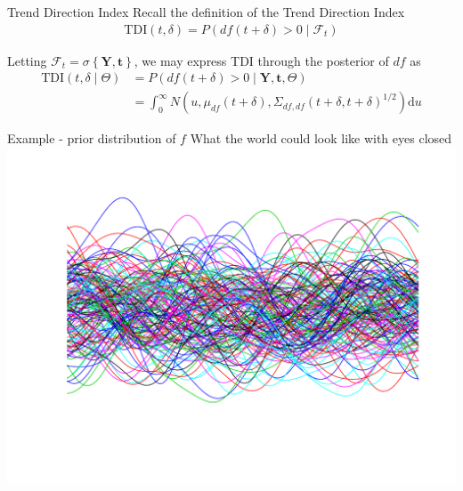 \documentclass[ignorenonframetext,xcolor=pdflatex,table,dvipsnames,serif]{beamer}
\begin{document}
\begin{frame}{Trend Direction Index}
Recall the definition of the \alert{Trend Direction Index}
\begin{align*}
  \mathrm{TDI}(t, \delta) = P(df(t + \delta) > 0 \mid \mathcal{F}_t)	
\end{align*}

\vspace{0.8cm}

Letting $\mathcal{F}_t = \sigma\left\{\mathbf{Y}, \mathbf{t}\right\}$, we may express TDI through the posterior of $df$ as
\begin{align*}
  \mathrm{TDI}(t, \delta \mid \Theta) &= P\left(df(t + \delta) > 0 \mid \mathbf{Y}, \mathbf{t}, \Theta\right)\\
        &= \int_0^\infty N\left(u, \mu_{df}(t + \delta), \Sigma_{df,df}(t + \delta,t + \delta)^{1/2}\right)\mathrm{d}u
\end{align*}
\end{frame}


\begin{frame}{Example - prior distribution of $f$}
  What the world could look like with eyes closed
  \center\includegraphics[scale=0.5]{postAni01}
\end{frame}
\end{document}
